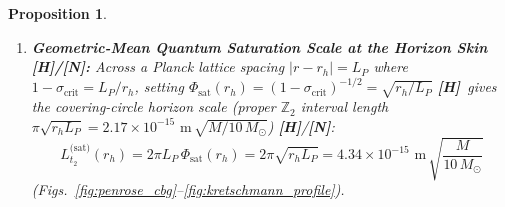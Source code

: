 \documentclass[11pt,a4paper]{article}
\newcommand{\catH}{\textbf{\textcolor{orange!85!black}{[H]}}}
\newcommand{\catN}{\textbf{\textcolor{teal!75!black}{[N]}}}
\theoremstyle{plain}
\newtheorem{proposition}[theorem]{Proposition}
\theoremstyle{definition}
\theoremstyle{remark}
\numberwithin{equation}{section}
\begin{document}
\begin{proposition}
\begin{enumerate}
  \begin{align}
    \mathcal{K}_5(r) &\equiv R_{ABCD}^{(5)}R^{ABCD}_{(5)} = \frac{12\,r_s^2\left(r^{12} - 4 r^9 r_{\text{core}}^3 + 18 r^6 r_{\text{core}}^6 - 2 r^3 r_{\text{core}}^9 + 2 r_{\text{core}}^{12}\right)}{\left(r^3 + r_{\text{core}}^3\right)^6}, \nonumber \\[4pt]
    \lim_{r \to 0} \mathcal{K}_5(r) &= \frac{24\,r_s^2}{r_{\text{core}}^6} = \frac{24\,r_s^2}{\left(r_s L_P^2 / 2\right)^2} = \frac{96}{L_P^4} < \infty.
    \label{eq:regularized_kretschmann_5d}
  \end{align}
  \item[\textnormal{(iii)}] \textbf{Geometric-Mean Quantum Saturation Scale at the Horizon Skin \catH/\catN:} Across a Planck lattice spacing $|r - r_h| = L_P$ where $1 - \sigma_{\text{crit}} = L_P/r_h$, setting $\Phi_{\text{sat}}(r_h) = (1 - \sigma_{\text{crit}})^{-1/2} = \sqrt{r_h/L_P}$ \catH\ gives the covering-circle horizon scale (proper $\mathbb{Z}_2$ interval length $\pi\sqrt{r_h L_P} = 2.17 \times 10^{-15}\text{ m}\,\sqrt{M/10\,M_\odot}$) \catH/\catN:
  \begin{equation}
    L_{t_2}^{\text{(sat)}}(r_h) = 2\pi L_P\,\Phi_{\text{sat}}(r_h) = 2\pi\sqrt{r_h L_P} = 4.34 \times 10^{-15}\text{ m}\,\sqrt{\frac{M}{10\,M_\odot}}
    \label{eq:planck_regularized_phi_max}
  \end{equation}
  (Figs.~\ref{fig:penrose_cbg}--\ref{fig:kretschmann_profile}).
\end{enumerate}
\end{proposition}
\end{document}
